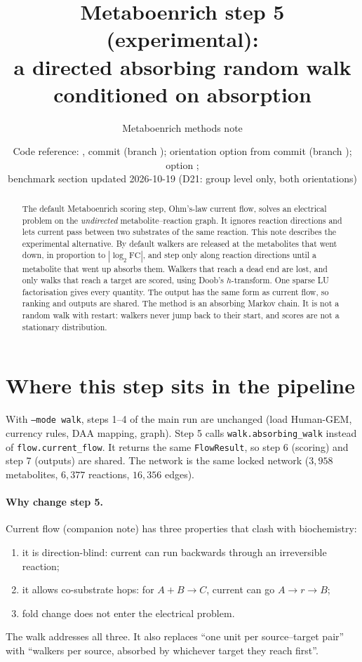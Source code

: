 \documentclass[11pt]{article}
\title{Metaboenrich step 5 (experimental):\\
a directed absorbing random walk conditioned on absorption}
\author{Metaboenrich methods note}
\date{Code reference: \code{metaboenrich/walk.py}, commit \code{0f6c135} (branch \code{directed-rw});
orientation option from commit \code{98874fc} (branch \code{flip-orientation}); option \code{--mode walk};\\
benchmark section updated 2026-10-19 (D21: group level only, both orientations)}
\newcommand{\code}[1]{\texttt{#1}}
\begin{document}
\maketitle

\begin{abstract}
The default Metaboenrich scoring step, Ohm's-law current flow, solves an electrical
problem on the \emph{undirected} metabolite--reaction graph. It ignores reaction
directions and lets current pass between two substrates of the same reaction. This
note describes the experimental alternative. By default walkers are released at the
metabolites that went down, in proportion to $|\log_2\mathrm{FC}|$, and step only along
reaction directions until a metabolite that went up absorbs them. Walkers that reach a
dead end are lost, and only walks that reach a target are scored, using Doob's
$h$-transform. One sparse LU factorisation gives every quantity. The output has the
same form as current flow, so ranking and outputs are shared. The method is an
absorbing Markov chain. It is not a random walk with restart: walkers never jump back
to their start, and scores are not a stationary distribution.
\end{abstract}

\tableofcontents

\section{Where this step sits in the pipeline}

With \code{--mode walk}, steps 1--4 of the main run are unchanged (load Human-GEM,
currency rules, DAA mapping, graph). Step 5 calls
\code{walk.absorbing\_walk} instead of \code{flow.current\_flow}. It returns the same
\code{FlowResult}, so step 6 (scoring) and step 7 (outputs) are shared. The network is
the same locked network ($3{,}958$ metabolites, $6{,}377$ reactions, $16{,}356$
edges).

\paragraph{Why change step 5.} Current flow (companion note) has three properties
that clash with biochemistry:
\begin{enumerate}[nosep]
  \item it is direction-blind: current can run backwards through an irreversible reaction;
  \item it allows co-substrate hops: for $A+B\to C$, current can go $A\to r\to B$;
  \item fold change does not enter the electrical problem.
\end{enumerate}
The walk addresses all three. It also replaces ``one unit per source--target pair''
with ``walkers per source, absorbed by whichever target they reach first''.
\end{document}
